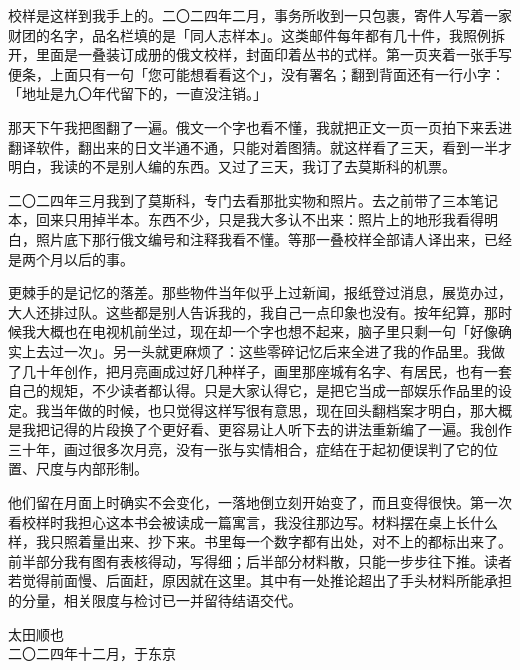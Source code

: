 校样是这样到我手上的。二〇二四年二月，事务所收到一只包裹，寄件人写着一家财团的名字，品名栏填的是「同人志样本」。这类邮件每年都有几十件，我照例拆开，里面是一叠装订成册的俄文校样，封面印着丛书的式样。第一页夹着一张手写便条，上面只有一句「您可能想看看这个」，没有署名；翻到背面还有一行小字：「地址是九〇年代留下的，一直没注销。」

那天下午我把图翻了一遍。俄文一个字也看不懂，我就把正文一页一页拍下来丢进翻译软件，翻出来的日文半通不通，只能对着图猜。就这样看了三天，看到一半才明白，我读的不是别人编的东西。又过了三天，我订了去莫斯科的机票。

二〇二四年三月我到了莫斯科，专门去看那批实物和照片。去之前带了三本笔记本，回来只用掉半本。东西不少，只是我大多认不出来：照片上的地形我看得明白，照片底下那行俄文编号和注释我看不懂。等那一叠校样全部请人译出来，已经是两个月以后的事。

更棘手的是记忆的落差。那些物件当年似乎上过新闻，报纸登过消息，展览办过，大人还排过队。这些都是别人告诉我的，我自己一点印象也没有。按年纪算，那时候我大概也在电视机前坐过，现在却一个字也想不起来，脑子里只剩一句「好像确实上去过一次」。另一头就更麻烦了：这些零碎记忆后来全进了我的作品里。我做了几十年创作，把月亮画成过好几种样子，画里那座城有名字、有居民，也有一套自己的规矩，不少读者都认得。只是大家认得它，是把它当成一部娱乐作品里的设定。我当年做的时候，也只觉得这样写很有意思，现在回头翻档案才明白，那大概是我把记得的片段换了个更好看、更容易让人听下去的讲法重新编了一遍。我创作三十年，画过很多次月亮，没有一张与实情相合，症结在于起初便误判了它的位置、尺度与内部形制。

他们留在月面上时确实不会变化，一落地倒立刻开始变了，而且变得很快。第一次看校样时我担心这本书会被读成一篇寓言，我没往那边写。材料摆在桌上长什么样，我只照着量出来、抄下来。书里每一个数字都有出处，对不上的都标出来了。前半部分我有图有表核得动，写得细；后半部分材料散，只能一步步往下推。读者若觉得前面慢、后面赶，原因就在这里。其中有一处推论超出了手头材料所能承担的分量，相关限度与检讨已一并留待结语交代。

\begin{flushright}
{\small 太田顺也}\\[2mm]
{\footnotesize\color{pencil} 二〇二四年十二月，于东京}
\end{flushright}

\clearpage
